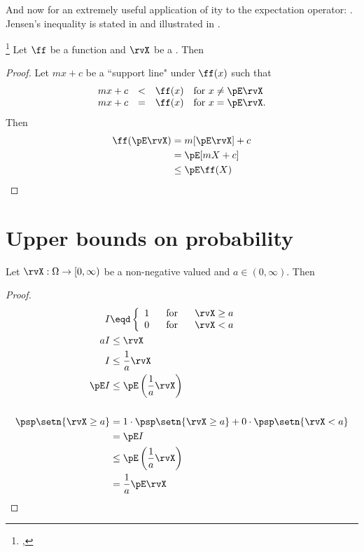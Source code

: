 And now for an extremely useful application of ity to the
expectation operator: .
Jensen's inequality is stated in 
and illustrated in .
\begin{theorem}
\footnote{
  ,
  }
\label{thm:jensen}
Let $\ff$ be a  function and $\rvX$ be a . Then
\end{theorem}
\begin{proof}
Let $mx+c$ be a ``support line" under $\ff(x)$ such that
\[
  \begin{array}{rcll}
    mx+c &<& \ff(x) & \mbox{for } x\ne \pE\rvX \\
    mx+c &=& \ff(x) & \mbox{for } x=\pE\rvX.
  \end{array}
\]
Then
\begin{align*}
  \ff(\pE\rvX)
    &=   m[\pE\rvX] + c
  \\&=   \pE[mX + c]
  \\&\le \pE\ff(X)
\end{align*}
\end{proof}


\section{Upper bounds on probability}
\begin{theorem}
Let $\rvX:\Omega\to[0,\infty)$ be a non-negative valued  and
$a\in(0,\infty)$. Then
\end{theorem}
\begin{proof}
\begin{align*}
  I &\eqd \left\{ \begin{array}{l@{\hspace{4ex}\mbox{for}\hspace{4ex}}l}
    1 &\rvX\ge a \\
    0 &\rvX < a
    \end{array}\right.
\\
  aI &\le\rvX           \\
   I &\le \frac{1}{a}\rvX \\
   \pE I &\le \pE\left(\frac{1}{a}\rvX\right) \\
\\
   \psp\setn{\rvX\ge a}
     &= 1\cdot\psp\setn{\rvX\ge a} + 0\cdot\psp\setn{\rvX<a}
   \\&= \pE I
   \\&\le \pE\left(\frac{1}{a}\rvX \right)
   \\&=   \frac{1}{a}\pE\rvX
\end{align*}
\end{proof}


